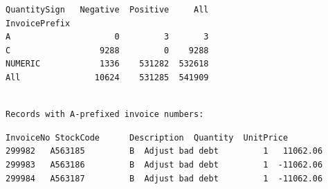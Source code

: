 \documentclass[11pt]{article}
\begin{document}
    
    \begin{Verbatim}[commandchars=\\\{\}]
QuantitySign   Negative  Positive     All
InvoicePrefix                            
A                     0         3       3
C                  9288         0    9288
NUMERIC            1336    531282  532618
All               10624    531285  541909
    \end{Verbatim}

    
    \begin{Verbatim}[commandchars=\\\{\}]

Records with A-prefixed invoice numbers:
    \end{Verbatim}

    
    \begin{Verbatim}[commandchars=\\\{\}]
       InvoiceNo StockCode      Description  Quantity  UnitPrice
299982   A563185         B  Adjust bad debt         1   11062.06
299983   A563186         B  Adjust bad debt         1  -11062.06
299984   A563187         B  Adjust bad debt         1  -11062.06
    \end{Verbatim}
\end{document}
